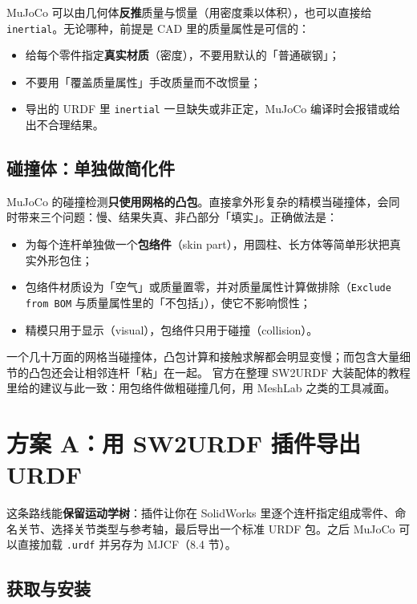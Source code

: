 MuJoCo 可以由几何体\textbf{反推}质量与惯量（用密度乘以体积），也可以直接给 \texttt{inertial}。无论哪种，前提是 CAD 里的质量属性是可信的：

\begin{itemize}
	\item 给每个零件指定\textbf{真实材质}（密度），不要用默认的「普通碳钢」；
	\item 不要用「覆盖质量属性」手改质量而不改惯量；
	\item 导出的 URDF 里 \texttt{inertial} 一旦缺失或非正定，MuJoCo 编译时会报错或给出不合理结果。
\end{itemize}

\subsection{碰撞体：单独做简化件}

MuJoCo 的碰撞检测\textbf{只使用网格的凸包}。直接拿外形复杂的精模当碰撞体，会同时带来三个问题：慢、结果失真、非凸部分「填实」。正确做法是：

\begin{itemize}
	\item 为每个连杆单独做一个\textbf{包络件}（skin part），用圆柱、长方体等简单形状把真实外形包住；
	\item 包络件材质设为「空气」或质量置零，并对质量属性计算做排除（\texttt{Exclude from BOM} 与质量属性里的「不包括」），使它不影响惯性；
	\item 精模只用于显示（visual），包络件只用于碰撞（collision）。
\end{itemize}

\begin{tipbox}[为什么值得多花这一步]
	一个几十万面的网格当碰撞体，凸包计算和接触求解都会明显变慢；而包含大量细节的凸包还会让相邻连杆「粘」在一起。
	官方在整理 SW2URDF 大装配体的教程里给的建议与此一致：用包络件做粗碰撞几何，用 MeshLab 之类的工具减面。
\end{tipbox}

\section{方案 A：用 SW2URDF 插件导出 URDF}

这条路线能\textbf{保留运动学树}：插件让你在 SolidWorks 里逐个连杆指定组成零件、命名关节、选择关节类型与参考轴，最后导出一个标准 URDF 包。之后 MuJoCo 可以直接加载 \texttt{.urdf} 并另存为 MJCF（8.4 节）。

\subsection{获取与安装}

